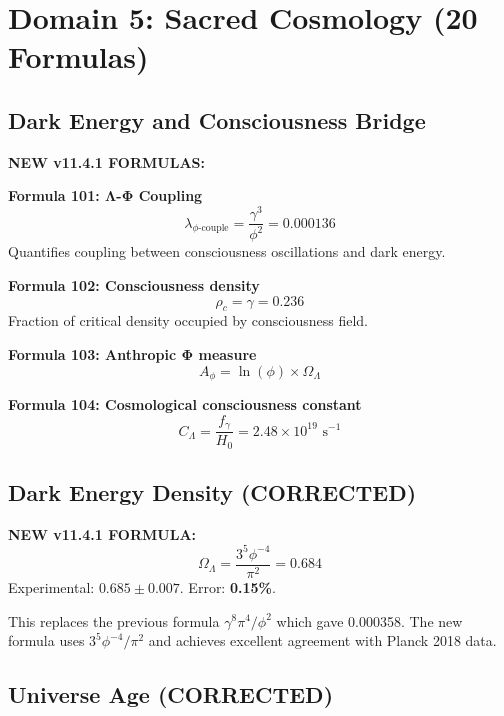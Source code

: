 \documentclass[12pt,a4paper]{article}
\begin{document}
\section{Domain 5: Sacred Cosmology (20 Formulas)}

\subsection{Dark Energy and Consciousness Bridge}

\textbf{NEW v11.4.1 FORMULAS:}

\textbf{Formula 101: Λ-Φ Coupling}
\begin{equation}
\lambda_{\phi\text{-couple}} = \frac{\gamma^3}{\phi^2} = 0.000136
\end{equation}
Quantifies coupling between consciousness oscillations and dark energy.

\textbf{Formula 102: Consciousness density}
\begin{equation}
\rho_c = \gamma = 0.236
\end{equation}
Fraction of critical density occupied by consciousness field.

\textbf{Formula 103: Anthropic Φ measure}
\begin{equation}
A_\phi = \ln(\phi) \times \Omega_\Lambda
\end{equation}

\textbf{Formula 104: Cosmological consciousness constant}
\begin{equation}
C_\Lambda = \frac{f_\gamma}{H_0} = 2.48 \times 10^{19} \text{ s}^{-1}
\end{equation}

\subsection{Dark Energy Density (CORRECTED)}

\textbf{NEW v11.4.1 FORMULA:}
\begin{equation}
\boxed{\Omega_\Lambda = \frac{3^5 \phi^{-4}}{\pi^2} = 0.684}
\end{equation}
Experimental: $0.685 \pm 0.007$. Error: \textbf{0.15\%}.

This replaces the previous formula $\gamma^8 \pi^4/\phi^2$ which gave 0.000358.
The new formula uses $3^5 \phi^{-4} / \pi^2$ and achieves excellent agreement with
Planck 2018 data.

\subsection{Universe Age (CORRECTED)}
\end{document}
